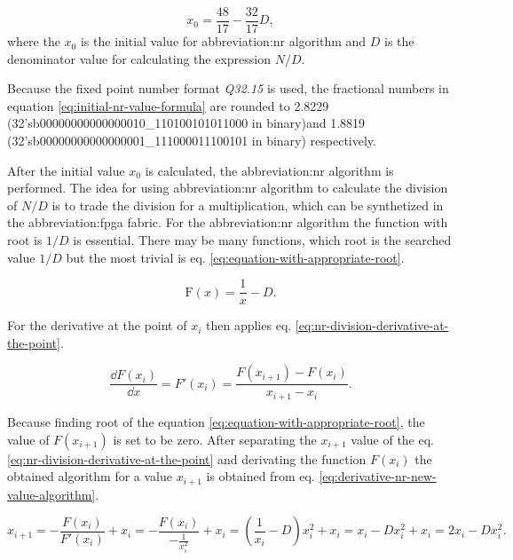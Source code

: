 \documentclass[a4paper, twoside, 11pt]{article}
\begin{document}
\begin{equation}\label{eq:initial-nr-value-formula}
x_0 = \frac{48}{17} - \frac{32}{17} D,
\end{equation}
where the $x_0$ is the initial value for \gls{abbreviation:nr} algorithm and $D$ is the denominator value for calculating the expression $N/D$.\par
Because the fixed point number format \textit{Q32.15} is used, the fractional numbers in equation \ref{eq:initial-nr-value-formula} are rounded to 2.8229 (32'sb00000000000000010\_110100101011000 in binary)\newline and 1.8819 (32'sb00000000000000001\_111000011100101 in binary) respectively.\par
After the initial value $x_0$ is calculated, the \gls{abbreviation:nr} algorithm is performed. The idea for using \gls{abbreviation:nr} algorithm to calculate the division of $N/D$ is to trade the division for a multiplication, which can be synthetized in the \gls{abbreviation:fpga} fabric. For the \gls{abbreviation:nr} algorithm the function with root is $1/D$ is essential. There may be many functions, which root is the searched value $1/D$ but the most trivial is eq. \ref{eq:equation-with-appropriate-root}.\par

\begin{equation}\label{eq:equation-with-appropriate-root}
  \text{F} (x) = \frac{1}{x} - D.
\end{equation}

\noindent For the derivative at the point of $x_i$ then applies eq. \ref{eq:nr-division-derivative-at-the-point}.

\begin{equation}\label{eq:nr-division-derivative-at-the-point}
  \frac{\dd F(x_i)}{\dd x} = F'(x_i) = \frac{F (x_{i+1}) - F (x_i)}{x_{i+1}-x_i}.
\end{equation}

\noindent Because finding root of the equation \ref{eq:equation-with-appropriate-root}, the value of $F (x_{i+1})$ is set to be zero. After separating the $x_{i+1}$ value of the eq. \ref{eq:nr-division-derivative-at-the-point} and derivating the function $F (x_i)$ the obtained algorithm for a value $x_{i+1}$ is obtained from eq. \ref{eq:derivative-nr-new-value-algorithm}.\par

\begin{equation}\label{eq:derivative-nr-new-value-algorithm}
  x_{i+1} = -\frac{F (x_i)}{F' (x_i)} + x_i = - \frac{F (x_i)}{-\frac{1}{x_i^2}} + x_i = (\frac{1}{x_i} - D) x_i^2 + x_i = x_i - D x_i^2 + x_i = 2 x_i - D x_i^2.
\end{equation}
\end{document}
